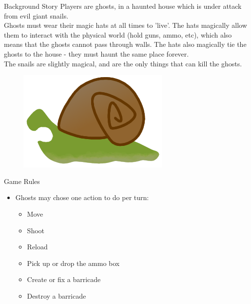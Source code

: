 \documentclass{beamer}
\begin{document}
\begin{frame}{Background Story}
  Players are ghosts, in a haunted house which is under attack from evil giant snails.\\
  Ghosts must wear their magic hats at all times to 'live'. The hats magically allow them to interact with the physical world (hold guns, ammo, etc), which also means that the ghosts cannot pass through walls. The hats also magically tie the ghosts to the house - they must haunt the same place forever.\\
  The snails are slightly magical, and are the only things that can kill the ghosts.\\
  \vspace{\baselineskip}
  \begin{figure}
    \hfill
    \includegraphics[scale=0.15]{snail_teeth_flip.png}
  \end{figure}
\end{frame}

\begin{frame}{Game Rules}
  \begin{itemize}
    \item Ghosts may chose one action to do per turn:
      \begin{itemize}
        \item Move
        \item Shoot
        \item Reload
        \item Pick up or drop the ammo box
        \item Create or fix a barricade
        \item Destroy a barricade
      \end{itemize}
  \end{itemize}
\end{frame}
\end{document}
